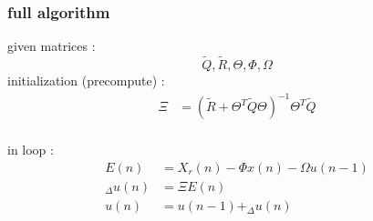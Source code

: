 \documentclass{beamer}
\begin{document}
\begin{frame}
  
  \frametitle{\bf full algorithm}
  given matrices : $$\tilde{Q}, \tilde{R}, \Theta, \Phi, \Omega$$
  initialization (precompute) :
  \begin{align*}
  \Xi &= (\tilde{R} + \Theta^T\tilde{Q}\Theta)^{-1} \Theta^T\tilde{Q} \\
  \end{align*}
  
  in loop :
  \begin{align*}
    E(n) &= X_r(n) - \Phi x(n) - \Omega u(n-1) \\
    _\Delta u(n) &= \Xi E(n) \\
    u(n) &= u(n-1) + _\Delta u(n)
  \end{align*}
\end{frame}
\end{document}
